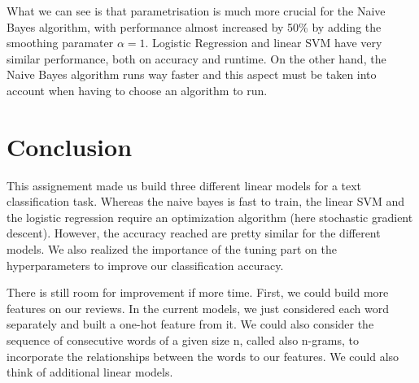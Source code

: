 \documentclass[11pt]{article}
\begin{document}
What we can see is that parametrisation is much more crucial for the Naive Bayes algorithm, with performance almost increased by 50\% by adding the smoothing paramater $\alpha = 1$. Logistic Regression and linear SVM have very similar performance, both on accuracy and runtime. On the other hand, the Naive Bayes algorithm runs way faster and this aspect must be taken into account when having to choose an algorithm to run.
 

\section{Conclusion}


This assignement made us build three different linear models for a text classification task. Whereas the naive bayes is fast to train, the linear SVM and the logistic regression require an optimization algorithm (here stochastic gradient descent). However, the accuracy reached are pretty similar for the different models. We also realized the importance of the tuning part on the hyperparameters to improve our classification accuracy.

There is still room for improvement if more time. First, we could build more features on our reviews. In the current models, we just considered each word separately and built a one-hot feature from it. We could also consider the sequence of consecutive words of a given size n, called also n-grams, to incorporate the relationships between the words to our features. We could also think of additional linear models.



\end{document}
